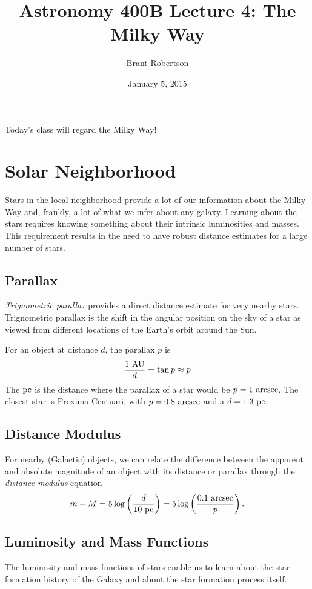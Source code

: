 \documentclass[]{article}
\title{Astronomy 400B Lecture 4: The Milky Way}
\author{Brant Robertson}
\date{January 5, 2015}
\begin{document}
\maketitle

Today's class will regard the Milky Way!

\section{Solar Neighborhood}

Stars in the local neighborhood provide a lot
of our information about the Milky Way and,
frankly, a lot of what we infer about any galaxy.
Learning about the stars requires knowing
something about their intrinsic luminosities
and masses. This requirement results in the
need to have robust distance estimates for
a large number of stars.

\subsection{Parallax}

{\it Trignometric parallax} provides a direct distance
estimate for very nearby stars.  Trignometric
parallax is the shift in the angular position on
the sky of a star as viewed from different
locations of the Earth's orbit around the Sun.

For an object at distance $d$, the parallax $p$
is
\begin{equation}
\frac{1~\mathrm{AU}}{d} = \tan p \approx p
\end{equation}
\noindent
The $\mathrm{pc}$ is the distance where the parallax
of a star would be $p=1~\mathrm{arcsec}$. The closest
star is Proxima Centuari, with $p=0.8~\mathrm{arcsec}$
and a $d=1.3~\mathrm{pc}$.

\subsection{Distance Modulus}

For nearby (Galactic) objects, we can relate the
difference between the apparent and absolute
magnitude of an object with its distance or
parallax through the {\it distance modulus}
equation
\begin{equation}
m-M = 5 \log \left(\frac{d}{10~\mathrm{pc}}\right) = 5 \log \left(\frac{0.1~\mathrm{arcsec}}{p}\right).
\end{equation}

\subsection{Luminosity and Mass Functions}
The luminosity and mass functions of stars enable
us to learn about the star formation history of
the Galaxy and about the star formation process
itself.
\end{document}

